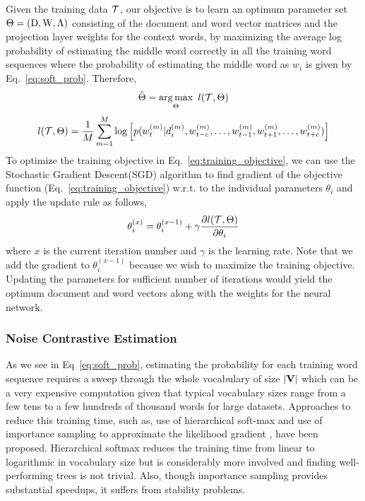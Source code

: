 Given the training data $\mathcal{T}$, our objective is to learn an optimum parameter set $\Theta = (\mathrm{D}, \mathrm{W}, \Lambda)$ consisting of the document and word vector matrices and the projection layer weights for the context words, by maximizing the average log probability of estimating the middle word correctly in all the training word sequences where the probability of estimating the middle word as $w_{i}$ is given by Eq.~\ref{eq:soft_prob}. Therefore, 
\begin{equation}
\label{eq:paramter_argmax}
\hat{\Theta} =  \operatorname*{arg\,max}_{\Theta}~l(\mathcal{T}, \Theta)
\end{equation}
\begin{equation}
\label{eq:training_objective}
l(\mathcal{T}, \Theta) = \frac{1}{M}\sum_{m=1}^{M} \log \left[p(w^{(m)}_{t} | d^{(m)}_{i}, w^{(m)}_{t-c}, \ldots, w^{(m)}_{t-1}, w^{(m)}_{t+1}, \ldots, w^{(m)}_{t+c})\right]
\end{equation}
To optimize the training objective in Eq.~\ref{eq:training_objective}, we can use the Stochastic Gradient Descent(SGD) algorithm to find gradient of the objective function (Eq.~\ref{eq:training_objective}) w.r.t. to the individual parameters $\theta_{i}$ and apply the update rule as follows,
\begin{equation}
\label{eq:update_theta}
\theta^{(x)}_{i} = \theta^{(x-1)}_{i} + \gamma\frac{\partial l(\mathcal{T}, \Theta)}{\partial \theta_{i}}
\end{equation}
where $x$ is the current iteration number and $\gamma$ is the learning rate. Note that we add the gradient to $\theta^{(x-1)}_{i}$ because we wish to maximize the training objective.
Updating the parameters for sufficient number of iterations would yield the optimum document and word vectors along with the weights for the neural network.

\subsubsection{Noise Contrastive Estimation}
As we see in Eq~\ref{eq:soft_prob}, estimating the probability for each training word sequence requires a sweep through the whole vocabulary of size $|\mathbf{V}|$ which can be a very expensive computation given that typical vocabulary sizes range from a few tens to a few hundreds of thousand words for large datasets. Approaches to reduce this training time, such as, use of hierarchical soft-max \citep{morin2005hierarchical} and use of importance sampling to approximate the likelihood gradient \citep{bengio2003quick}, \citep{bengio2008adaptive} have been proposed. 
Hierarchical softmax reduces the training time from linear to logarithmic in vocabulary size but is considerably more involved and finding well-performing trees is not trivial. Also, though importance sampling provides substantial speedups, it suffers from stability problems.

